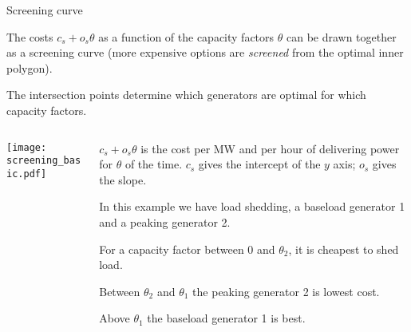 \documentclass[10pt,aspectratio=169,dvipsnames]{beamer}
\begin{document}
\begin{frame}{Screening curve}

  The costs $c_s + o_s\theta$ as a function of the capacity factors $\theta$ can be drawn
  together as a \alert{screening curve} (more expensive options are
  \emph{screened} from the optimal inner polygon).

  The intersection points determine which generators are optimal for which capacity factors.

\begin{columns}[T]
  \begin{column}{7cm}
    \texttt{[image: screening\_basic.pdf]}
  \end{column}

  \begin{column}{7cm}
    $c_s + o_s\theta $ is the cost per MW and per hour of delivering power for $\theta$ of the time.
    $c_s$ gives the intercept of the $y$ axis; $o_s$ gives the slope.

    \vspace{.3cm}

    In this example we have load shedding, a baseload generator 1 and a peaking generator 2.

    For a capacity factor between  0 and $\theta_2$, it is cheapest to shed load.

    Between $\theta_2$ and $\theta_1$ the peaking generator 2 is lowest cost.

    Above $\theta_1$ the baseload generator 1 is best.

  \end{column}
\end{columns}

\end{frame}
\end{document}
